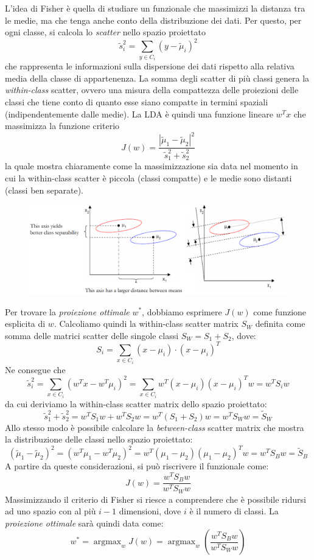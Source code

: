 \documentclass[a4paper,oneside,titlepage]{book}
\DeclareMathOperator*{\argmax}{\arg\max}
\begin{document}
\noindent
L'idea di Fisher è quella di studiare un funzionale che massimizzi la distanza tra le medie, ma che tenga anche conto della distribuzione dei dati. Per questo, per ogni classe, si calcola lo \textit{scatter} nello spazio proiettato
\[ \tilde{s}_i^2 = \sum_{y \in C_i} (y - \tilde{\mu}_i)^2 \]
che rappresenta le informazioni sulla dispersione dei dati rispetto alla relativa media della classe di appartenenza. La somma degli scatter di più classi genera la \textit{within-class} scatter, ovvero una misura della compattezza delle proiezioni delle classi che tiene conto di quanto esse siano compatte in termini spaziali (indipendentemente dalle medie). La LDA è quindi una funzione lineare $w^T x$ che massimizza la funzione criterio
\[ J(w) = \frac{|\tilde{\mu}_1 - \tilde{\mu}_2|^2}{\tilde{s}_1^2 + \tilde{s}_2^2} \]
la quale mostra chiaramente come la massimizzazione sia data nel momento in cui la within-class scatter è piccola (classi compatte) e le medie sono distanti (classi ben separate).
\begin{figure}[htp]
	\centering
	\includegraphics[width=\textwidth, height=\textheight, keepaspectratio]{lda2.png}
\end{figure}

\noindent
Per trovare la \textit{proiezione ottimale} $w^*$, dobbiamo esprimere $J(w)$ come funzione esplicita di $w$. Calcoliamo quindi la within-class scatter matrix $S_W$ definita come somma delle matrici scatter delle singole classi $S_W = S_1 + S_2$, dove:
\[ S_i = \sum_{x \in C_i} (x - \mu_i) \cdot (x - \mu_i)^T \]
Ne consegue che
\[ \tilde{s}_i^2 = \sum_{x \in C_i} (w^T x - w^T \mu_i)^2 = \sum_{x \in C_i} w^T (x - \mu_i) (x - \mu_i)^T w = w^T S_i w \]
da cui deriviamo la within-class scatter matrix dello spazio proiettato:
\[ \tilde{s}_1^2 + \tilde{s}_2^2 = w^T S_1 w + w^T S_2 w = w^T (S_1 + S_2) w = w^T S_W w = \tilde{S}_W \]
Allo stesso modo è possibile calcolare la \textit{between-class} scatter matrix che mostra la distribuzione delle classi nello spazio proiettato:
\[ (\tilde{\mu}_1 - \tilde{\mu}_2)^2 = (w^T \mu_1 - w^T \mu_2)^2 = w^T (\mu_1 - \mu_2) (\mu_1 - \mu_2)^T w = w^T S_B w = \tilde{S}_B \]
A partire da queste considerazioni, si può riscrivere il funzionale come:
\[ J(w) = \frac{w^T S_B w}{w^T S_W w} \]
Massimizzando il criterio di Fisher si riesce a comprendere che è possibile ridursi ad uno spazio con al più $i-1$ dimensioni, dove $i$ è il numero di classi. La \textit{proiezione ottimale} sarà quindi data come:
\[ w^* = \argmax_w J(w) = \argmax_w \left( \frac{w^T S_B w}{w^T S_W w} \right) \]
\end{document}
